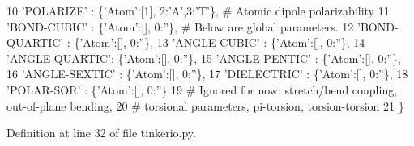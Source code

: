 \begin{DoxyCode}
10          \textcolor{stringliteral}{'POLARIZE'}     : \{\textcolor{stringliteral}{'Atom'}:[1], 2:\textcolor{stringliteral}{'A'},3:\textcolor{stringliteral}{'T'}\},       \textcolor{comment}{# Atomic dipole polarizability}
11          \textcolor{stringliteral}{'BOND-CUBIC'}   : \{\textcolor{stringliteral}{'Atom'}:[], 0:\textcolor{stringliteral}{''}\},    \textcolor{comment}{# Below are global parameters.}
12          \textcolor{stringliteral}{'BOND-QUARTIC'} : \{\textcolor{stringliteral}{'Atom'}:[], 0:\textcolor{stringliteral}{''}\},
13          \textcolor{stringliteral}{'ANGLE-CUBIC'}  : \{\textcolor{stringliteral}{'Atom'}:[], 0:\textcolor{stringliteral}{''}\},
14          \textcolor{stringliteral}{'ANGLE-QUARTIC'}: \{\textcolor{stringliteral}{'Atom'}:[], 0:\textcolor{stringliteral}{''}\},
15          \textcolor{stringliteral}{'ANGLE-PENTIC'} : \{\textcolor{stringliteral}{'Atom'}:[], 0:\textcolor{stringliteral}{''}\},
16          \textcolor{stringliteral}{'ANGLE-SEXTIC'} : \{\textcolor{stringliteral}{'Atom'}:[], 0:\textcolor{stringliteral}{''}\},
17          \textcolor{stringliteral}{'DIELECTRIC'}   : \{\textcolor{stringliteral}{'Atom'}:[], 0:\textcolor{stringliteral}{''}\},
18          \textcolor{stringliteral}{'POLAR-SOR'}    : \{\textcolor{stringliteral}{'Atom'}:[], 0:\textcolor{stringliteral}{''}\}
19                                                 \textcolor{comment}{# Ignored for now: stretch/bend coupling, out-of-plane
       bending,}
20                                                 \textcolor{comment}{# torsional parameters, pi-torsion, torsion-torsion}
21          \}
\end{DoxyCode}


Definition at line 32 of file tinkerio.\-py.

